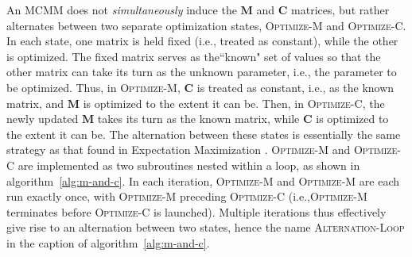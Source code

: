 An MCMM does not \emph{simultaneously} induce the 
$\textbf{M}$ and $\textbf{C}$ matrices, but rather 
alternates between two separate optimization states, \textsc{Optimize-M} and \textsc{Optimize-C}. 
In each state, one matrix is held fixed (i.e., treated as constant), 
while the other is optimized. The fixed matrix serves as the``known" set 
of values so that the other matrix can take its turn as the unknown 
parameter, i.e., the parameter to be optimized.
Thus, in \textsc{Optimize-M}, $\textbf{C}$ is treated as constant, i.e., 
as the known matrix, and $\textbf{M}$ is optimized to the extent it can be. 
Then, in \textsc{Optimize-C}, 
the newly updated $\textbf{M}$ takes its turn as the known matrix, 
while $\textbf{C}$ is optimized to the extent it can be. The alternation 
between these states is essentially the same strategy as that found in 
Expectation Maximization \citep{dempster-et-al:1977}.
\textsc{Optimize-M} and \textsc{Optimize-C} are implemented as two subroutines 
nested within a loop, as shown in algorithm~\ref{alg:m-and-c}. %
In each iteration, \textsc{Optimize-M}  and \textsc{Optimize-M} are each run exactly once, 
with \textsc{Optimize-M} preceding \textsc{Optimize-C} (i.e.,\textsc{Optimize-M} 
terminates before \textsc{Optimize-C} is launched). Multiple iterations thus effectively 
give rise to an alternation between two states, hence the name \textsc{Alternation-Loop} in the caption of algorithm~\ref{alg:m-and-c}.

